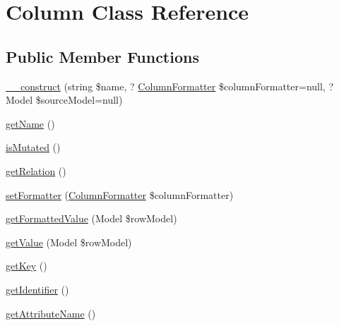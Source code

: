 \hypertarget{classhamburgscleanest_1_1_data_tables_1_1_models_1_1_column_1_1_column}{}\section{Column Class Reference}
\label{classhamburgscleanest_1_1_data_tables_1_1_models_1_1_column_1_1_column}
\subsection*{Public Member Functions}
\begin{DoxyCompactItemize}
\item 
\hyperlink{classhamburgscleanest_1_1_data_tables_1_1_models_1_1_column_1_1_column_aa16affacdbc8a91c3aec70663e12bf5e}{\+\_\+\+\_\+construct} (string \$name, ? \hyperlink{interfacehamburgscleanest_1_1_data_tables_1_1_interfaces_1_1_column_formatter}{Column\+Formatter} \$column\+Formatter=null, ? Model \$source\+Model=null)
\item 
\hyperlink{classhamburgscleanest_1_1_data_tables_1_1_models_1_1_column_1_1_column_a3d0963e68bb313b163a73f2803c64600}{get\+Name} ()
\item 
\hyperlink{classhamburgscleanest_1_1_data_tables_1_1_models_1_1_column_1_1_column_a9fd9950b3ac06ef862967a8033ea4fad}{is\+Mutated} ()
\item 
\hyperlink{classhamburgscleanest_1_1_data_tables_1_1_models_1_1_column_1_1_column_ab4da3592f01f7673fec5163a047cc82e}{get\+Relation} ()
\item 
\hyperlink{classhamburgscleanest_1_1_data_tables_1_1_models_1_1_column_1_1_column_ab66956c2516c8994e6965e79e73bae56}{set\+Formatter} (\hyperlink{interfacehamburgscleanest_1_1_data_tables_1_1_interfaces_1_1_column_formatter}{Column\+Formatter} \$column\+Formatter)
\item 
\hyperlink{classhamburgscleanest_1_1_data_tables_1_1_models_1_1_column_1_1_column_a26f5178f9badcf426408b131cb925797}{get\+Formatted\+Value} (Model \$row\+Model)
\item 
\hyperlink{classhamburgscleanest_1_1_data_tables_1_1_models_1_1_column_1_1_column_ae1281be756bd4669920b08da359f3dd6}{get\+Value} (Model \$row\+Model)
\item 
\hyperlink{classhamburgscleanest_1_1_data_tables_1_1_models_1_1_column_1_1_column_ad40c766ec8aced9770fe6ae269a1e781}{get\+Key} ()
\item 
\hyperlink{classhamburgscleanest_1_1_data_tables_1_1_models_1_1_column_1_1_column_a6da3f4f9718ce7343730b457b255b477}{get\+Identifier} ()
\item 
\hyperlink{classhamburgscleanest_1_1_data_tables_1_1_models_1_1_column_1_1_column_aef428fd06c26df985591f168f4387ddf}{get\+Attribute\+Name} ()
\end{DoxyCompactItemize}



